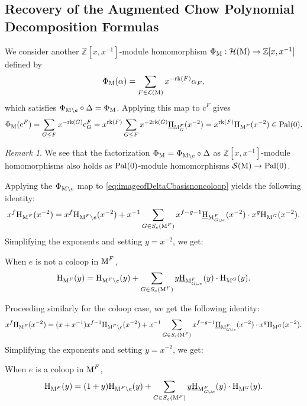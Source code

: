 \documentclass[11pt]{article}
\newcommand{\calH}{\mathcal{H}}
\newcommand{\calS}{\mathcal{S}}
\newcommand{\chow}{\normalfont\text{\underline{H}}}
\newcommand{\augchow}{\normalfont\text{H}}
\newcommand{\rank}{\normalfont\text{rk}}
\newcommand{\M}{\normalfont\text{M}}
\newcommand{\ZZ}{\mathbb{Z}}
\newcommand{\Cbasis}[1]{\mathrm{c}^{#1}}
\newcommand{\pal}{\normalfont\text{Pal}}
\theoremstyle{remark}
\newtheorem*{remark}{Remark} %
\begin{document}
\subsection{Recovery of the Augmented Chow Polynomial Decomposition Formulas}
We consider another \(\ZZ[x, x^{-1}]\)-module homomorphism
\(\Phi_{\M} : \calH(\M) \to \ZZ[x, x^{-1}]\) defined by
\[\Phi_{\M}(\alpha) = \sum_{F \in \mathcal{L}(\M)} x^{-\rank(F)} \alpha_F,\]
which satisfies \(\Phi_{\M\setminus e}\circ \Delta = \Phi_{\M}\).
Applying this map to \(\Cbasis{F}\) gives
\[\Phi_{\M}(\Cbasis{F}) = \sum_{G \le F} x^{-\rank(G)} \Cbasis{F}_G =
    x^{\rank(F)}\sum_{G \le F} x^{-2\rank(G)} \chow_{\M_G^F}(x^{-2}) =
    x^{\rank(F)} \augchow_{\M^F}(x^{-2}) \in \pal(0).\]
\begin{remark}
    We see that the factorization \(\Phi_{\M} = \Phi_{\M\setminus e}\circ \Delta \)
    as \(\ZZ[x, x^{-1}]\)-module homomorphisms also holds as \(\pal(0)\)-module homomorphisms
    \(\calS(\M) \to \pal(0)\).
\end{remark}

Applying the \(\Phi_{\M\setminus e}\) map to \eqref{eq:imageofDeltaCbasisnoncoloop} yields the following identity:
\[ x^f \augchow_{\M^F}(x^{-2}) = x^f \augchow_{\M^F\setminus e}(x^{-2}) +
    x^{-1}\sum_{G \in S_e(\M^F)} x^{f-g-1}\chow_{\M^F_{G\cup e}}(x^{-2}) \cdot x^g\augchow_{\M^G}(x^{-2}). \]
Simplifying the exponents and setting \(y=x^{-2}\), we get:
\begin{tcolorbox}
    When \(e\) is not a coloop in \(\M^F\),
    \begin{equation} \label{eq:augchow-decomposition-noncoloop}
        \augchow_{\M^F}(y) = \augchow_{\M^F\setminus e}(y) +
        \sum_{G \in S_e(\M^F)} y \chow_{\M^F_{G\cup e}}(y) \cdot \augchow_{\M^G}(y).
    \end{equation}
\end{tcolorbox}
Proceeding similarly for the coloop case, we get the following identity:
\[ x^f \augchow_{\M^F}(x^{-2}) = (x+x^{-1})x^{f-1}\augchow_{\M^F\setminus e}(x^{-2}) +
    x^{-1}\sum_{G \in S_e(\M^F)} x^{f-g-1}\chow_{\M^F_{G\cup e}}(x^{-2}) \cdot x^g\augchow_{\M^G}(x^{-2}). \]
Simplifying the exponents and setting \(y=x^{-2}\), we get:
\begin{tcolorbox}
    When \(e\) is a coloop in \(\M^F\),
    \begin{equation} \label{eq:augchow-decomposition-coloop}
        \augchow_{\M^F}(y) = (1+y)\augchow_{\M^F\setminus e}(y) +
        \sum_{G \in S_e(\M^F)} y \chow_{\M^F_{G\cup e}}(y) \cdot \augchow_{\M^G}(y).
    \end{equation}
\end{tcolorbox}
\end{document}
